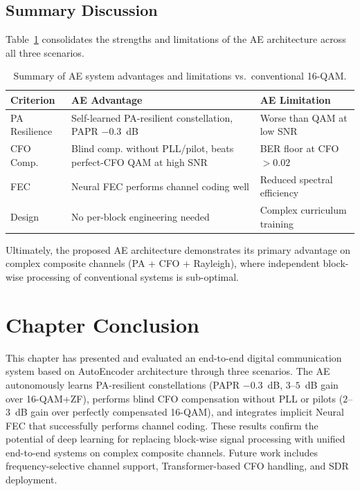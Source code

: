 \documentclass[a4paper,14pt]{extreport}
\begin{document}
\subsection{Summary Discussion}

Table~\ref{tab:summary} consolidates the strengths and limitations of the AE architecture across all three scenarios.

\begin{table}[H]
\caption{Summary of AE system advantages and limitations vs.\ conventional 16-QAM.}
\label{tab:summary}
\centering
\begin{tabularx}{\textwidth}{>{\raggedright\arraybackslash}p{2.5cm} >{\raggedright\arraybackslash}X >{\raggedright\arraybackslash}X}
\toprule
\textbf{Criterion} & \textbf{AE Advantage} & \textbf{AE Limitation} \\
\midrule
PA Resilience & Self-learned PA-resilient constellation, PAPR $-$0.3~dB & Worse than QAM at low SNR \\
CFO Comp. & Blind comp. without PLL/pilot, beats perfect-CFO QAM at high SNR & BER floor at CFO $> 0.02$ \\
FEC & Neural FEC performs channel coding well & Reduced spectral efficiency \\
Design & No per-block engineering needed & Complex curriculum training \\
\bottomrule
\end{tabularx}
\end{table}

Ultimately, the proposed AE architecture demonstrates its primary advantage on complex composite channels (PA + CFO + Rayleigh), where independent block-wise processing of conventional systems is sub-optimal.

\section{Chapter Conclusion}

This chapter has presented and evaluated an end-to-end digital communication system based on AutoEncoder architecture through three scenarios. The AE autonomously learns PA-resilient constellations (PAPR $-$0.3~dB, $3$--$5$~dB gain over 16-QAM+ZF), performs blind CFO compensation without PLL or pilots ($2$--$3$~dB gain over perfectly compensated 16-QAM), and integrates implicit Neural FEC that successfully performs channel coding. These results confirm the potential of deep learning for replacing block-wise signal processing with unified end-to-end systems on complex composite channels. Future work includes frequency-selective channel support, Transformer-based CFO handling, and SDR deployment.
\end{document}
